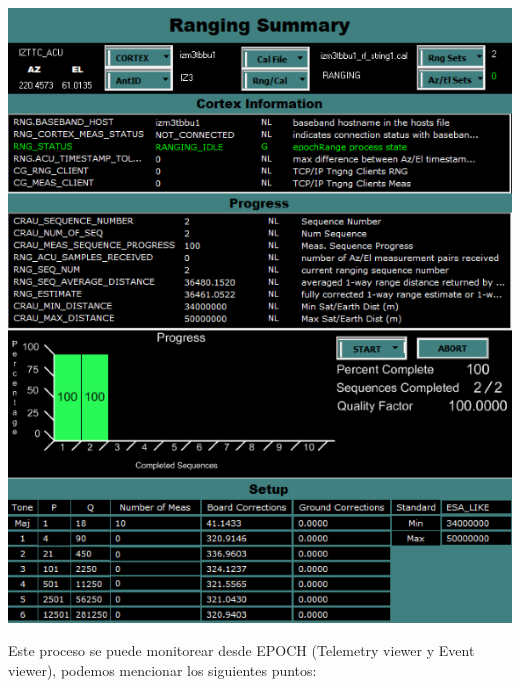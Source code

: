 \documentclass[11pt]{article}
\begin{document}
    \includegraphics{./diagrams/rng_screen.png}

    Este proceso se puede monitorear desde EPOCH (Telemetry viewer y Event
viewer), podemos mencionar los siguientes puntos:
\end{document}
